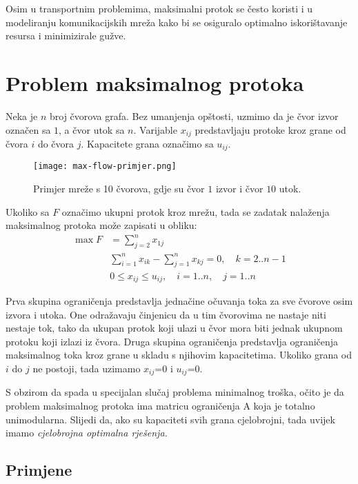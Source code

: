 \documentclass[11pt, a4paper]{article}
\begin{document}
		Osim u transportnim problemima, maksimalni protok se često koristi i u modeliranju komunikacijskih mreža kako bi se osiguralo optimalno iskorištavanje resursa i minimizirale gužve.
	
	\newpage
	\section{Problem maksimalnog protoka}
	
	Neka je $n$ broj čvorova grafa. Bez umanjenja opštosti, uzmimo da je čvor izvor označen sa $1$, a čvor utok sa $n$. Varijable $x_{ij}$ predstavljaju protoke kroz grane od čvora $i$ do čvora $j$. Kapacitete grana označimo sa $u_{ij}$.
	
	\begin{figure}[h]
		\centering
		\texttt{[image: max-flow-primjer.png]}
		\caption{Primjer mreže s 10 čvorova, gdje su čvor $1$ izvor i čvor $10$ utok.}
		\label{fig:max-flow-primjer}
	\end{figure}
	
	 Ukoliko sa $F$ označimo ukupni protok kroz mrežu, tada se zadatak nalaženja maksimalnog protoka može zapisati u obliku:
	\begin{align*}
		\max F &= \sum_{j=2}^n x_{1j} \\
		&\sum_{i=1}^n  x_{ik} - \sum_{j=1}^n x_{kj} = 0, \quad k = 2 .. n - 1 \\
		&0 \leq x_{ij} \leq u_{ij}, \quad i = 1 .. n, \quad j = 1 .. n
	\end{align*}
	
	Prva skupina ograničenja predstavlja jednačine očuvanja toka za sve čvorove osim izvora i utoka. One odražavaju činjenicu da u tim čvorovima ne nastaje niti nestaje tok, tako da ukupan protok koji ulazi u čvor mora biti jednak ukupnom protoku koji izlazi iz čvora. Druga skupina ograničenja predstavlja ograničenja maksimalnog toka kroz grane u skladu s njihovim kapacitetima. Ukoliko grana od $i$ do $j$ ne postoji, tada uzimamo $x_{ij}$=0 i $u_{ij}$=0.
	
	S obzirom da spada u specijalan slučaj problema minimalnog troška, očito je da problem maksimalnog protoka ima matricu ograničenja A koja je totalno unimodularna. Slijedi da, ako su kapaciteti svih grana cjelobrojni, tada uvijek imamo \textit{cjelobrojna optimalna rješenja.}
	
	\subsection{Primjene}
	
\end{document}
